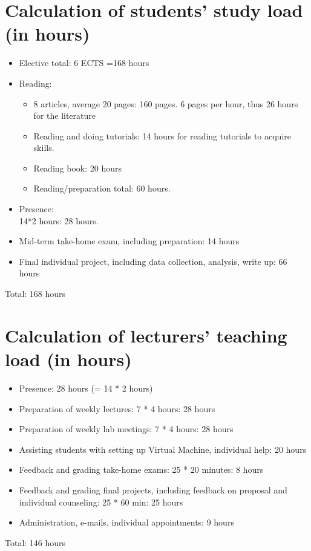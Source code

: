 \documentclass[a4paper,12pt]{report}
\begin{document}
\chapter{Calculation of students' study load (in hours)}
\begin{itemize}

\item Elective total: 6 ECTS =168 hours
\item Reading: 
\begin{itemize}
	\item 8 articles, average 20 pages: 160 pages. 6 pages per hour, thus 26 hours for the literature
	\item Reading and doing tutorials: 14 hours for reading tutorials to acquire skills.
	\item Reading book: 20 hours
	\item Reading/preparation total: 60 hours.
\end{itemize}
\item Presence: \\14*2 hours: 28 hours.
\item Mid-term take-home exam, including preparation: 14 hours
\item Final individual project, including data collection, analysis, write up: 66 hours
\end{itemize}

Total: 168 hours

\chapter{Calculation of lecturers' teaching load (in hours)}
\begin{itemize}
\item Presence: 28 hours (= 14 * 2 hours)
\item Preparation of weekly lectures: 7 * 4 hours: 28 hours
\item Preparation of weekly lab meetings:  7 * 4 hours: 28 hours
\item Assisting students with setting up Virtual Machine, individual help: 20 hours
\item Feedback and grading take-home exams: 25 * 20 minutes: 8 hours
\item Feedback and grading final projects, including feedback on proposal and individual counseling: 25 * 60 min: 25 hours 
\item Administration, e-mails, individual appointments: 9 hours
\end{itemize}
Total: 146 hours




 
 
 
\end{document}
